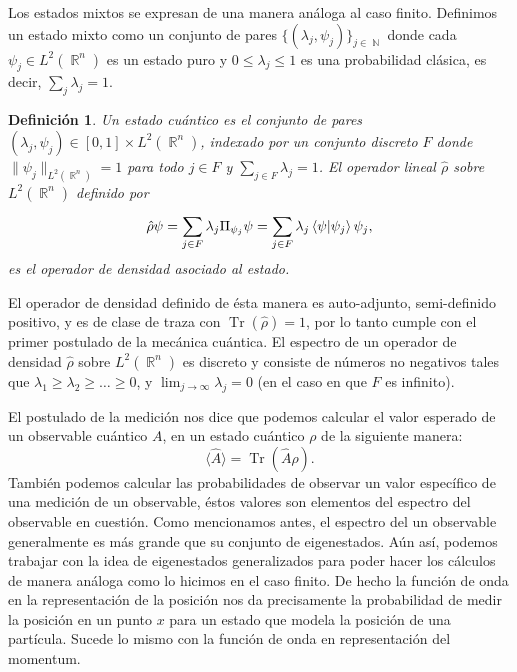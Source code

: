 \documentclass[a4paper,11pt]{report}
\DeclareMathOperator{\R}{\mathbb{R}}
\DeclareMathOperator{\N}{\mathbb{N}}
\DeclareMathOperator{\Tr}{Tr}
\newtheorem{definition}{Definición}
\begin{document}
  Los estados mixtos se expresan de una manera análoga al
  caso finito. Definimos un estado mixto como un conjunto de
  pares $\{(\lambda_j,\psi_j)\}_{j \in \N}$ donde cada
  $\psi_j \in L^2(\R^{n})$ es un estado puro y $0 \leq
  \lambda_j \leq 1$ es una probabilidad clásica, es decir,
  $\sum_j \lambda_j = 1$.
  \begin{definition}
    Un estado cuántico es el conjunto de pares $(\lambda_j,
    \psi_j) \in [0,1] \times L^2(\R^{n})$, indexado por un
    conjunto discreto $F$ donde $\|\psi_j\|_{L^2(\R^{n})} =
    1$ para todo $j \in F$ y $\sum_{j \in F} \lambda_j = 1$.
    El operador lineal $\hat{\rho}$ sobre $L^2(\R^{n})$
    definido por
    \begin{equation}
      \hat{\rho} \psi
      = \sum_{j \in F}^{} \lambda_j \Pi_{\psi_j} \psi
      = \sum_{j \in F}^{} \lambda_j \braket{\psi| \psi_j}
      \psi_j,
    \end{equation}
    es el operador de densidad asociado al estado. 
  \end{definition}
  El operador de densidad definido de ésta manera es
  auto-adjunto, semi-definido positivo, y es de clase de
  traza con $\Tr(\hat{\rho}) = 1$, por lo tanto cumple con
  el primer postulado de la mecánica cuántica. El espectro
  de un operador de densidad $\hat{\rho}$ sobre
  $L^2(\R^{n})$ es discreto y consiste de números no
  negativos tales que $\lambda_1 \geq \lambda_2 \geq \ldots
  \geq 0$, y $\lim_{j \to \infty} \lambda_j = 0$ (en el caso
  en que $F$ es infinito).

  El postulado de la medición nos dice que podemos calcular
  el valor esperado de un observable cuántico $A$, en un
  estado cuántico $\rho$ de la siguiente manera:
  \begin{equation}
    \langle \hat A \rangle = \Tr(\hat A \rho).
  \end{equation}
  También podemos calcular las probabilidades de observar un
  valor específico de una medición de un observable, éstos
  valores son elementos del espectro del observable en
  cuestión.  Como mencionamos antes, el espectro del un
  observable generalmente es más grande que su conjunto de
  eigenestados. Aún así, podemos trabajar con la idea de
  eigenestados generalizados para poder hacer los cálculos
  de manera análoga como lo hicimos en el caso finito. De
  hecho la función de onda en la representación de la
  posición nos da precisamente la probabilidad de medir la
  posición en un punto $x$ para un estado que modela la
  posición de una partícula. Sucede lo mismo con la función
  de onda en representación del momentum.
  
\end{document}
